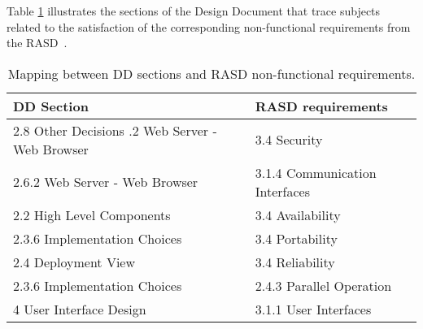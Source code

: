 Table \ref{nf_reqs_trace} illustrates the sections of the Design Document that trace subjects related to the satisfaction of the corresponding non-functional requirements from the RASD~\cite{rasd}.
\begin{table}
\begin{center}
\begin{tabular}{p{} | p{}}
\hline
\textbf{DD Section} & \textbf{RASD requirements}\\
\hline
2.8 Other Decisions \newline 2.6.2 Web Server - Web Browser & 3.4 Security \\
\hline
2.6.2 Web Server - Web Browser & 3.1.4 Communication Interfaces \\
\hline
2.2 High Level Components & 3.4 Availability \\
\hline
2.3.6 Implementation Choices & 3.4 Portability \\
\hline
2.4 Deployment View & 3.4 Reliability \\
\hline
2.3.6 Implementation Choices & 2.4.3 Parallel Operation \\
\hline
4 User Interface Design & 3.1.1 User Interfaces \\
\hline
\end{tabular}
\end{center}
\caption{Mapping between DD sections and RASD non-functional requirements.}
\label{nf_reqs_trace}
\end{table}